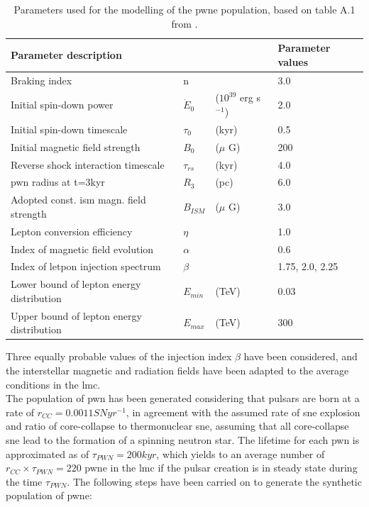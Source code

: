 \documentclass[main.tex]{subfiles}
\begin{document}
\begin{table}
  \centering
  \begin{tabular}{llll}
    \hline
    Parameter description & & & Parameter values \\
    \hline
    Braking index & n &  & 3.0 \\
    Initial spin-down power & $\dot E_{0}$ & ($10^{39}$ erg s$^{-1}$) & 2.0 \\
    Initial spin-down timescale &$\tau_{0}$ & (kyr) & 0.5 \\
    Initial magnetic field strength & $B_{0}$ & ($\mu$ G) & 200\\
    Reverse shock interaction timescale & $\tau_{rs}$ & (kyr) & 4.0 \\
    \gls{pwn} radius at t=3kyr & $R_{3}$ & (pc) & 6.0 \\
    Adopted const. \gls{ism} magn. field strength & $B_{ISM}$ &($\mu$ G) & 3.0 \\
    Lepton conversion efficiency & $\eta$ & & 1.0 \\
    Index of magnetic field evolution & $\alpha$ & & 0.6 \\
    Index of letpon injection spectrum & $\beta$ & & 1.75, 2.0, 2.25\\
    Lower bound of lepton energy distribution & $E_{min}$ & (TeV) & 0.03 \\
    Upper bound of lepton energy distribution & $E_{max}$ & (TeV) & 300\\
    \hline
  \end{tabular}
  \caption{Parameters used for the modelling of the \gls{pwne} population, based on table A.1 from \cite{2018hessPWNe}.}
  \label{tab:baselinemodelpwne}
\end{table}

Three equally probable values of the injection index $\beta$ have been considered, and the interstellar magnetic and radiation fields have been adapted to the average conditions in the \gls{lmc}.\\
The population of \gls{pwn} has been generated considering that pulsars are born at a rate of $r_{CC} = 0.0011 SN yr^{-1}$, in agreement with the assumed rate of \gls{sne} explosion and ratio of core-collapse to thermonuclear \gls{sne}, assuming that all core-collapse \gls{sne} lead to the formation of a spinning neutron star. The lifetime for each \gls{pwn} is approximated as of $\tau_{PWN} = 200 kyr$, which yields to an average number of $r_{CC} \times \tau_{PWN} = 220$ \gls{pwne} in the \gls{lmc} if the pulsar creation is in steady state during the time $\tau_{PWN}$. The following steps have been carried on to generate the synthetic population of \gls{pwne}:
\end{document}
